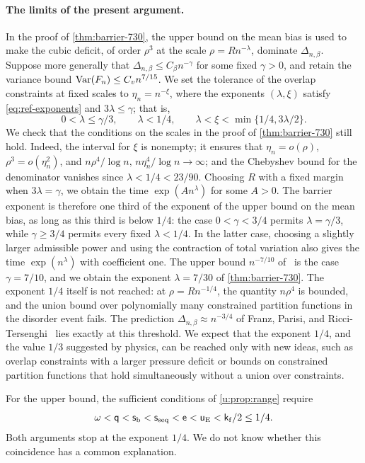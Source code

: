 \paragraph{The limits of the present argument.}
In the proof of \cref{thm:barrier-730}, the upper bound on the mean bias is
used to make the cubic deficit, of order $\rho^3$ at the scale
$\rho=Rn^{-\lambda}$, dominate $\Delta_{n,\beta}$. Suppose more generally that
$\Delta_{n,\beta}\le C_\beta n^{-\gamma}$ for some fixed $\gamma>0$, and retain the
variance bound $\operatorname{Var}(F_n)\le C_v n^{7/15}$. We set the tolerance of the
overlap constraints at fixed scales to $\eta_n=n^{-\xi}$, where the exponents
$(\lambda,\xi)$ satisfy \eqref{eq:ref-exponents} and $3\lambda\le \gamma$; that is,
\[
 0<\lambda\le \gamma/3,\qquad \lambda<1/4,\qquad \lambda<\xi<\min\{1/4,3\lambda/2\}.
\]
We check that the conditions on the scales in the proof of
\cref{thm:barrier-730} still hold. Indeed, the
interval for $\xi$ is nonempty; it ensures that $\eta_n=o(\rho)$,
$\rho^3=o(\eta_n^2)$, and $n\rho^4/\log n,\,n\eta_n^4/\log n\to\infty$; and the
Chebyshev bound for the denominator vanishes since $\lambda<1/4<23/90$.
Choosing $R$ with a fixed margin when $3\lambda=\gamma$, we obtain the time
$\exp(An^{\lambda})$ for some $A>0$. The barrier exponent is therefore one third of
the exponent of the upper bound on the mean bias, as long as this third is
below $1/4$: the case $0<\gamma<3/4$ permits $\lambda=\gamma/3$, while $\gamma\ge3/4$ permits
every fixed $\lambda<1/4$. In the latter case, choosing a slightly larger
admissible power and using the contraction of total variation also gives the
time $\exp(n^\lambda)$ with coefficient one. The upper bound $n^{-7/10}$
of~\cite[Theorem~1.1]{hexagon-bias} is the case $\gamma=7/10$, and we obtain the
exponent $\lambda=7/30$ of \cref{thm:barrier-730}. The exponent $1/4$ itself
is not reached: at $\rho=Rn^{-1/4}$, the quantity $n\rho^4$ is bounded, and
the union bound over polynomially many constrained partition functions in the
disorder event fails. The prediction $\Delta_{n,\beta}\approx n^{-3/4}$ of
Franz, Parisi, and Ricci-Tersenghi~\cite{franz-parisi-ricci-2026} lies exactly
at this threshold. We expect that the exponent $1/4$, and the value $1/3$
suggested by physics, can be reached only with new ideas, such as overlap
constraints with a larger pressure deficit or bounds on constrained partition
functions that hold simultaneously without a union over constraints.

For the upper bound, the sufficient conditions of \cref{u:prop:range}
require
\[
 \omega<\mathsf{q}<\mathsf{s}_{\rm b}<\mathsf{s}_{\rm seq}<\mathsf{e}
 <\mathsf{u}_{\rm E}<\mathsf{k}_{\rm f}/2\le1/4.
\]
Both arguments stop at the exponent $1/4$. We do not know whether this
coincidence has a common explanation.

